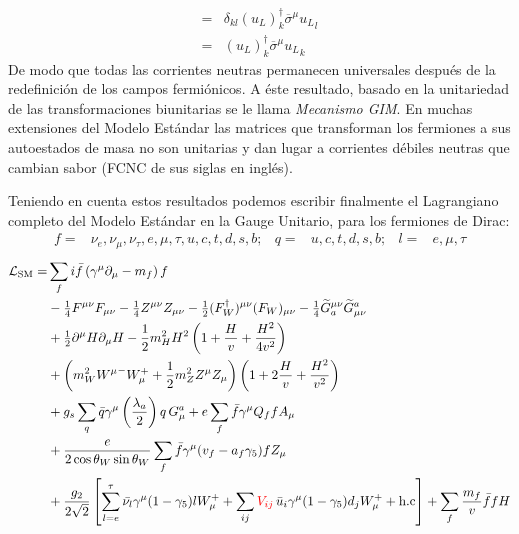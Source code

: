 \begin{frame}
\begin{align}
  =&\delta_{kl}(u_L)^{\dagger}_k \overline{\sigma}^\mu{u_L}_l\nonumber\\
  =&(u_L)^{\dagger}_k\overline{\sigma}^\mu {u_L}_k
 \end{align}
De modo que todas las corrientes neutras permanecen universales después de la redefinición de los campos fermiónicos. A éste resultado, basado en la unitariedad de las transformaciones biunitarias se le llama \emph{Mecanismo GIM}. En muchas extensiones del Modelo Estándar las matrices que transforman los fermiones a sus autoestados de masa no son unitarias y dan lugar a corrientes débiles neutras que cambian sabor (FCNC de sus siglas en inglés). 


Teniendo en cuenta estos resultados podemos escribir finalmente el Lagrangiano completo del Modelo Estándar en la Gauge Unitario, para los fermiones de Dirac:
\begin{align}
  f=&\nu_e,\nu_\mu,\nu_\tau,e,\mu,\tau,u,c,t,d,s,b;&q=&u,c,t,d,s,b;&l=&e,\mu,\tau
\end{align}
\begin{align}
   \mathcal{L}_{\text{SM}}=&\sum_f i\bar{f}\left(\gamma^\mu\partial_\mu-m_f\right)f\nonumber\\
&-\tfrac{1}{4}F^{\mu\nu} F_{\mu\nu}-\tfrac{1}{4}Z^{\mu\nu} Z_{\mu\nu}-\tfrac{1}{2}(F_W^\dagger)^{\mu\nu} (F_W)_{\mu\nu}
- \tfrac{1}{4}\widetilde{G}^{\mu\nu}_a \widetilde{G}_{\mu\nu}^a\nonumber\\
&+\tfrac{1}{2}\partial^\mu H\partial_\mu H
-\frac{1}{2}m_H^2H^2\left(1+\frac{H}{v}+\frac{H^2}{4v^2}\right)\nonumber\\
&+\left(m_W^2{W^\mu}^-W_\mu^++\frac{1}{2}m_Z^2Z^\mu Z_\mu\right)\left(1+2\frac{H}{v}+\frac{H^2}{v^2}\right)\nonumber\\
&+g_s\sum_q\bar{q}\gamma^\mu\left(\frac{\lambda_a}{2}\right)q\,G_\mu^a+e\sum_f \bar{f}\gamma^\mu Q_f f A_\mu\nonumber\\
&+\frac{e}{2\cos\theta_W\sin\theta_W}\sum_{f}\bar{f}\gamma^\mu(v_f-a_f\gamma_5)f Z_\mu\nonumber\\
&+\frac{g_2}{2\sqrt{2}}\left[\sum_{l=e}^{\tau}\bar{\nu_l}\gamma^\mu(1-\gamma_5)l W_\mu^++\sum_{ij}{\color{red}V_{ij}}\,\bar{u}_i\gamma^\mu(1-\gamma_5)d_j W_\mu^++\text{h.c}\right]
+\sum_f \frac{m_f}{v} \bar{f}f H\nonumber\\

\end{align}
\end{frame}
